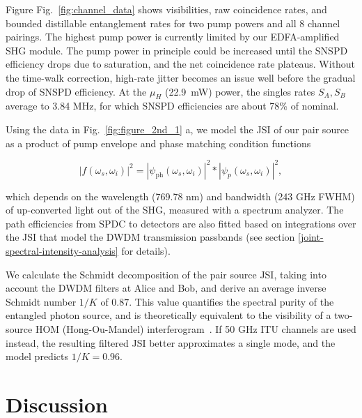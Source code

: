 \documentclass[11pt]{caltech_thesis} %
\begin{document}
Figure Fig.~\ref{fig:channel_data} shows visibilities, raw coincidence rates, and bounded distillable entanglement rates for two pump powers and all 8 channel pairings. The highest pump power is currently limited by our EDFA-amplified SHG module. The pump power in principle could be increased until the SNSPD efficiency drops due to saturation, and the net coincidence rate plateaus. Without the time-walk correction, high-rate jitter becomes an issue well before the gradual drop of SNSPD efficiency. At the $\mu_H$ (22.9~mW) power, the singles rates $S_A, S_B$ average to 3.84 MHz, for which SNSPD efficiencies are about 78\% of nominal.

Using the data in Fig.~\ref{fig:figure_2nd_1} a, we model the JSI of our pair source as a product of pump envelope and phase matching condition functions

$$
|f(\omega_s, \omega_i)|^2 = |\psi_{\mathrm{ph}}\left(\omega_s, \omega_i\right)|^2 *|\psi_p\left(\omega_s, \omega_i\right)|^2,
$$

which depends on the wavelength (769.78 nm) and bandwidth (243 GHz FWHM) of up-converted light out of the SHG, measured with a spectrum analyzer. The path efficiencies from SPDC to detectors are also fitted based on integrations over the JSI that model the DWDM transmission passbands (see section \ref{joint-spectral-intensity-analysis} for details).

We calculate the Schmidt decomposition of the pair source JSI, taking into account the DWDM filters at Alice and Bob, and derive an average inverse Schmidt number $1/K$ of $0.87$. This value quantifies the spectral purity of the entangled photon source, and is theoretically equivalent to the visibility of a two-source HOM (Hong-Ou-Mandel) interferogram~\autocite{mandel1995optical}. If 50 GHz ITU channels are used instead, the resulting filtered JSI better approximates a single mode, and the model predicts $1/K = 0.96$.

\hypertarget{discussion-1}{%
\section{Discussion}\label{discussion-1}}
\end{document}
